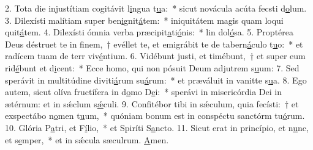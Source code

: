2. Tota die injustítiam cogitávit l\uline{i}ngua t\uline{u}a:~* sicut novácula acúta fecsti d\uline{o}lum.
3. Dilexísti malítiam super ben\uline{i}gnit\uline{á}tem:~* iniquitátem magis quam loqui quit\uline{á}tem.
4. Dilexísti ómnia verba præcipit\uline{a}ti\uline{ó}nis:~* lin dol\uline{ó}sa.
5. Proptérea Deus déstruet te in finem,~† evéllet te, et emigrábit te de tabern\uline{á}culo t\uline{u}o:~* et radícem tuam de terr viv\uline{é}ntium.
6. Vidébunt justi, et timébunt,~† et super eum rid\uline{é}bunt et d\uline{i}cent:~* Ecce homo, qui non pósuit Deum adjutrem s\uline{u}um:
7. Sed sperávit in multitúdine diviti\uline{á}rum su\uline{á}rum:~* et præváluit in vanitte s\uline{u}a.
8. Ego autem, sicut olíva fructífera in d\uline{o}mo D\uline{e}i:~* sperávi in misericórdia Dei in ætérnum: et in sǽclum s\uline{ǽ}culi.
9. Confitébor tibi in sǽculum, quia fecísti:~† et exspectábo n\uline{o}men t\uline{u}um,~* quóniam bonum est in conspéctu sanctórm tu\uline{ó}rum.
10. Glória P\uline{a}tri, et F\uline{í}lio,~* et Spiríti S\uline{a}ncto.
11. Sicut erat in princípio, et n\uline{u}nc, et s\uline{e}mper,~* et in sǽcula sæculrum. \uline{A}men.

